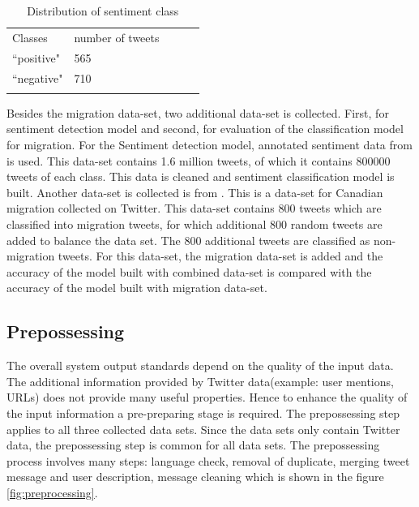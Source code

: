\begin{table}[]
\centering
\begin{tabular}{lllll}
\cline{1-2}
\multicolumn{1}{|l|}{Classes}   & \multicolumn{1}{l|}{number of tweets} &  &  &  \\ \cline{1-2}
\multicolumn{1}{|l|}{``positive"} & \multicolumn{1}{l|}{565}  &  &  &  \\ \cline{1-2}
\multicolumn{1}{|l|}{``negative"}   & \multicolumn{1}{l|}{710}  &  &  &  \\ \cline{1-2}
                            &                           &  &  & 
\label{tab:Distribution of sentiment class}
\end{tabular}
\caption{Distribution of sentiment class}
\label{tab:DistsentimentClass}
\end{table}

Besides the migration data-set, two additional data-set is collected. First, for sentiment detection model and second, for evaluation of the classification model for migration. For the Sentiment detection model, annotated sentiment data from \cite{stanford_data} is used. This data-set contains 1.6 million tweets, of which it contains  800000 tweets of each class. This data is cleaned and sentiment classification model is built. Another data-set is collected is from \cite{CanadianmMigrationDataset}. This is a data-set for Canadian migration collected on Twitter. This data-set contains 800 tweets which are classified into migration tweets, for which additional 800 random tweets are added to balance the data set. The 800 additional tweets are classified as non-migration tweets. For this data-set, the migration data-set is added and the accuracy of the model built with combined data-set is compared with the accuracy of the model built with migration data-set. 



\subsection{Prepossessing} \label{preprocessing}
The overall system output standards depend on the quality of the input data. The additional information provided by Twitter data(example: user mentions, URLs) does not provide many useful properties. Hence to enhance the quality of the input information a pre-preparing stage is required. The prepossessing step applies to all three collected data sets. Since the data sets only contain Twitter data, the prepossessing step is common for all data sets. The prepossessing process involves many steps: language check, removal of duplicate, merging tweet message and user description, message cleaning which is shown in the figure \ref{fig:preprocessing}. 

